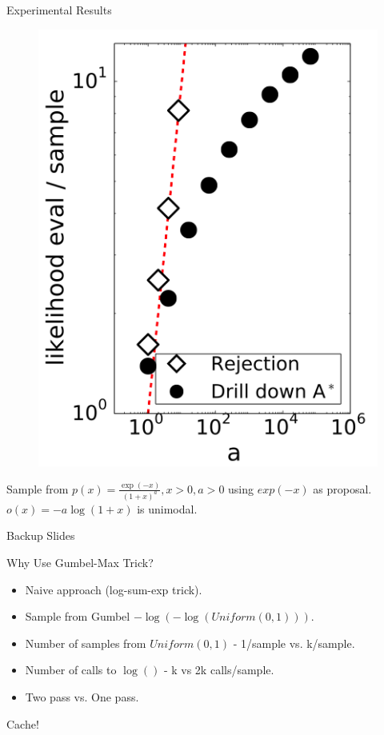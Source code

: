 \begin{frame}{Experimental Results}
  \begin{figure} 
    \centering
      \includegraphics[scale=0.30]{images/astar.png}
  \end{figure}
  Sample from $p(x)=\frac{\exp(-x)}{(1+x)^a},x>0,a>0$ using $exp(-x)$ as proposal.
  $o(x) = -a\log(1+x)$ is unimodal. 
\end{frame}

\begin{frame}
  Backup Slides
\end{frame}

\begin{frame}{Why Use Gumbel-Max Trick?}
  \begin{itemize}[<+->]
  \item Naive approach (log-sum-exp trick).
  \item Sample from Gumbel $-\log(-\log(Uniform(0,1)))$.
  \item Number of samples from $Uniform(0,1)$ - 1/sample vs. k/sample.
  \item Number of calls to $\log()$ - k vs 2k calls/sample.
  \item Two pass vs. One pass.
  \end{itemize}
  \begin{center}
    Cache!
  \end{center}
\end{frame}

